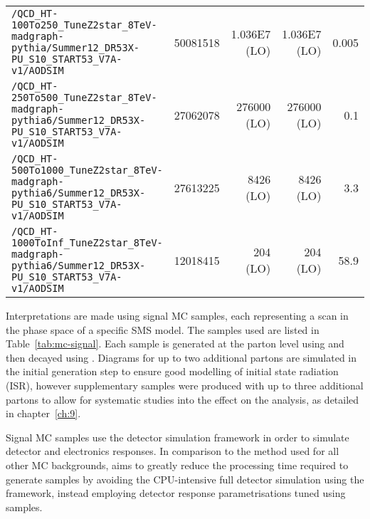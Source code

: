 \begin{landscape}
\begin{center}
\begin{table}[ht]
\begin{tabular}{ lrrrr }
        \verb!/QCD_HT-100To250_TuneZ2star_8TeV-madgraph-pythia/Summer12_DR53X-PU_S10_START53_V7A-v1/AODSIM!       & 50081518 & 1.036E7 (LO) & 1.036E7 (LO) & 0.005   \\
        \verb!/QCD_HT-250To500_TuneZ2star_8TeV-madgraph-pythia6/Summer12_DR53X-PU_S10_START53_V7A-v1/AODSIM!      & 27062078 & 276000 (LO) & 276000 (LO) & 0.1     \\
        \verb!/QCD_HT-500To1000_TuneZ2star_8TeV-madgraph-pythia6/Summer12_DR53X-PU_S10_START53_V7A-v1/AODSIM!     & 27613225 & 8426 (LO)   & 8426   (LO) & 3.3     \\
        \verb!/QCD_HT-1000ToInf_TuneZ2star_8TeV-madgraph-pythia6/Summer12_DR53X-PU_S10_START53_V7A-v1/AODSIM!     & 12018415 & 204 (LO)    & 204    (LO) & 58.9    \\
        \hline
      \end{tabular}
    \end{table}
  \end{center}
\end{landscape}

Interpretations are made using signal MC samples, each representing a scan in 
the phase space of a specific SMS model. The samples used are listed in
Table~\ref{tab:mc-signal}. Each sample is generated at the parton level using \MADGRAPHFIVE and then
decayed using \PYTHIASIX. Diagrams for up to two additional
partons are simulated
in the initial generation step to ensure good modelling of initial state 
radiation (ISR), however supplementary samples were produced with up to three
additional partons to allow for systematic studies into the effect on the 
analysis, as detailed in chapter~\ref{ch:9}.

Signal MC samples use the \FASTSIM detector simulation framework in order to
simulate detector and electronics responses. In comparison to the \FULLSIM method
used for all other MC backgrounds, \FASTSIM aims to greatly reduce the
processing time required to generate samples by avoiding the CPU-intensive
full detector simulation using the \geant framework, instead employing detector
response parametrisations tuned using \FULLSIM samples.

